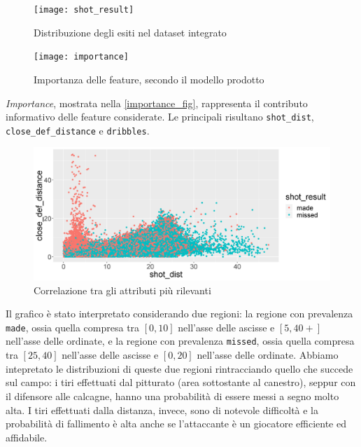 \begin{figure}
\caption{Distribuzione degli esiti nel dataset integrato}
\label{dist_shot_result}
	\texttt{[image: shot\_result]}
\end{figure}

\par

\begin{figure}
\caption{Importanza delle feature, secondo il modello prodotto}
\label{importance_fig}
\fontsize{9pt}{1em}
	\texttt{[image: importance]}
\end{figure}

\par

\textit{Importance}, mostrata nella \autoref{importance_fig}, rappresenta il contributo informativo delle feature considerate. Le principali risultano \texttt{shot\_dist}, \texttt{close\_def\_distance} e \texttt{dribbles}.

\begin{figure}
\caption{Correlazione tra gli attributi più rilevanti}
\label{plot_shot_dist_def}
\includegraphics[width=\linewidth]{plot_shot_dist_def.png}
\end{figure}

Il grafico è stato interpretato considerando due regioni: la regione con prevalenza \texttt{made}, ossia quella compresa tra $[0, 10]$ nell'asse delle ascisse e $[5, 40+] $ nell'asse delle ordinate, e la regione con prevalenza \texttt{missed}, ossia quella compresa tra $[25, 40]$ nell'asse delle ascisse e $[0, 20] $ nell'asse delle ordinate.
Abbiamo intepretato le distribuzioni di queste due regioni rintracciando quello che succede sul campo: i tiri effettuati dal pitturato (area sottostante al canestro), seppur con il difensore alle calcagne, hanno una probabilità di essere messi a segno molto alta. I tiri effettuati dalla distanza, invece, sono di notevole difficoltà e la probabilità di fallimento è alta anche se l'attaccante è un giocatore efficiente ed affidabile.

